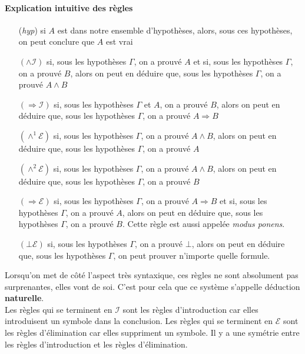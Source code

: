 \documentclass[a4paper,12pt]{article}
\theoremstyle{plain}
\begin{document}
\paragraph{Explication intuitive des règles}
\begin{itemize}
\setlength\itemsep{ -1.5 em}
\item[(\textit{hyp})] si $A$ est dans notre ensemble d'hypothèses, alors, sous ces hypothèses, on peut conclure que $A$ est vrai\\
\item[$(\land \mathcal{I})$] si, sous les hypothèses $\Gamma$, on a prouvé $A$ et si, sous les hypothèses $\Gamma$, on a prouvé $B$, alors on peut en déduire que, sous les hypothèses $\Gamma$, on a prouvé $A \land B$\\
\item[$(\Rightarrow\mathcal{I})$] si, sous les hypothèses $\Gamma$ et $A$, on a prouvé $B$, alors on peut en déduire que, sous les hypothèses $\Gamma$, on a prouvé $A \Rightarrow B$\\
\item[$(\land^1 \mathcal{E})$] si, sous les hypothèses $\Gamma$, on a prouvé $A \land B$, alors on peut en déduire que, sous les hypothèses $\Gamma$, on a prouvé $A$\\
\item[$(\land^2 \mathcal{E})$] si, sous les hypothèses $\Gamma$, on a prouvé $A \land B$, alors on peut en déduire que, sous les hypothèses $\Gamma$, on a prouvé $B$\\
\item[ $(\Rightarrow\mathcal{E})$] si, sous les hypothèses $\Gamma$, on a prouvé $A \Rightarrow B$ et si, sous les hypothèses $\Gamma$, on a prouvé $A$, alors on peut en déduire que, sous les hypothèses $\Gamma$, on a prouvé $B$. Cette règle est aussi appelée \textit{modus ponens}.\\
\item[$(\bot \mathcal{E})$]  si, sous les hypothèses $\Gamma$, on a prouvé $\bot$, alors on peut en déduire que, sous les hypothèses $\Gamma$, on peut prouver n'importe quelle formule.
\end{itemize}

Lorsqu'on met de côté l'aspect très syntaxique, ces règles ne sont absolument pas surprenantes, elles vont de soi. C'est pour cela que ce système s'appelle déduction \textbf{naturelle}.\\

Les règles qui se terminent en $\mathcal{I}$ sont les règles d'introduction car elles introduisent un symbole dans la conclusion. Les règles qui se terminent en $\mathcal{E}$ sont les règles d'élimination car elles suppriment un symbole. Il y a une symétrie entre les règles d'introduction et les règles d'élimination.
\end{document}
